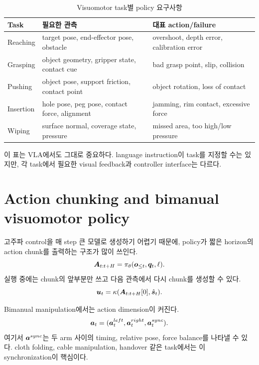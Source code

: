 \begin{table}[ht]
\centering
\caption{Visuomotor task별 policy 요구사항}
\label{tab:visuomotor-tasks}
\small
\begin{tabularx}{\textwidth}{p{26mm}X X}
\toprule
Task & 필요한 관측 & 대표 action/failure \\
\midrule
Reaching & target pose, end-effector pose, obstacle & overshoot, depth error, calibration error \\
Grasping & object geometry, gripper state, contact cue & bad grasp point, slip, collision \\
Pushing & object pose, support friction, contact point & object rotation, loss of contact \\
Insertion & hole pose, peg pose, contact force, alignment & jamming, rim contact, excessive force \\
Wiping & surface normal, coverage state, pressure & missed area, too high/low pressure \\
\bottomrule
\end{tabularx}
\end{table}

이 표는 VLA에서도 그대로 중요하다. language instruction이 task를 지정할 수는 있지만, 각 task에서 필요한 visual feedback과 controller interface는 다르다.

\section{Action chunking and bimanual visuomotor policy}

고주파 control을 매 step 큰 모델로 생성하기 어렵기 때문에, policy가 짧은 horizon의 action chunk를 출력하는 구조가 많이 쓰인다.
\begin{equation}
  \bm{A}_{t:t+H}
  =
  \pi_{\theta}(\bm{o}_{\le t},\bm{q}_t,\ell).
  \label{eq:visuomotor-action-chunk}
\end{equation}
실행 중에는 chunk의 앞부분만 쓰고 다음 관측에서 다시 chunk를 생성할 수 있다.
\begin{equation}
  \bm{u}_t
  =
  \kappa(\bm{A}_{t:t+H}[0],\hat{\bm{s}}_t).
  \label{eq:chunk-execution}
\end{equation}

Bimanual manipulation에서는 action dimension이 커진다.
\begin{equation}
  \bm{a}_t
  =
  (\bm{a}^{left}_t,\bm{a}^{right}_t,\bm{a}^{sync}_t).
  \label{eq:bimanual-action}
\end{equation}
여기서 $\bm{a}^{sync}$는 두 arm 사이의 timing, relative pose, force balance를 나타낼 수 있다. cloth folding, cable manipulation, handover 같은 task에서는 이 synchronization이 핵심이다.

